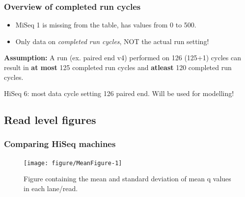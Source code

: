\documentclass[10pt]{beamer}\usepackage[]{graphicx}\usepackage[]{color}
\newenvironment{knitrout}{}{} %
\begin{document}
 \begin{frame}\frametitle{Overview of completed run cycles}
 \begin{itemize}
 \item MiSeq 1 is missing from the table, has values from 0 to 500.
 \item Only data on \textit{completed run cycles}, NOT the actual run setting! 
 \end{itemize}
 \pause

 \textbf{Assumption:}
 \pause
A run (ex. paired end v4) performed on 126 (125+1) cycles can result in \textbf{at most} 125 completed run cycles and \textbf{atleast} 120 completed run cycles.

HiSeq 6: most data cycle setting 126 paired end. Will be used for modelling!
\end{frame}



\subsection{Read level figures}
\begin{frame}\frametitle{Comparing HiSeq machines}
\begin{knitrout}
\color{fgcolor}\begin{figure}
\texttt{[image: figure/MeanFigure-1]} \caption[Figure containing the mean and standard deviation of mean q values in each lane/read]{Figure containing the mean and standard deviation of mean q values in each lane/read.}\label{fig:MeanFigure}
\end{figure}


\end{knitrout}
\end{frame}
\end{document}
